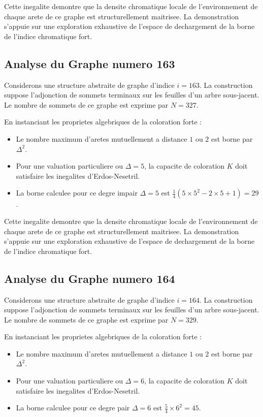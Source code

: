 \documentclass[11pt,a4paper]{article}
\begin{document}
Cette inegalite demontre que la densite chromatique locale de l'environnement de chaque arete de ce graphe est structurellement maitrisee. La demonstration s'appuie sur une exploration exhaustive de l'espace de dechargement de la borne de l'indice chromatique fort.

\subsection{Analyse du Graphe numero 163}
Considerons une structure abstraite de graphe d'indice $i = 163$. La construction suppose l'adjonction de sommets terminaux sur les feuilles d'un arbre sous-jacent. Le nombre de sommets de ce graphe est exprime par $N = 327$.

En instanciant les proprietes algebriques de la coloration forte :
\begin{itemize}
\item Le nombre maximum d'aretes mutuellement a distance $1$ ou $2$ est borne par $\Delta^2$.
\item Pour une valuation particuliere ou $\Delta = 5$, la capacite de coloration $K$ doit satisfaire les inegalites d'Erdos-Nesetril.
\item La borne calculee pour ce degre impair $\Delta = 5$ est $\frac{1}{4}(5 \times 5^2 - 2 \times 5 + 1) = 29$.
\end{itemize}

Cette inegalite demontre que la densite chromatique locale de l'environnement de chaque arete de ce graphe est structurellement maitrisee. La demonstration s'appuie sur une exploration exhaustive de l'espace de dechargement de la borne de l'indice chromatique fort.

\subsection{Analyse du Graphe numero 164}
Considerons une structure abstraite de graphe d'indice $i = 164$. La construction suppose l'adjonction de sommets terminaux sur les feuilles d'un arbre sous-jacent. Le nombre de sommets de ce graphe est exprime par $N = 329$.

En instanciant les proprietes algebriques de la coloration forte :
\begin{itemize}
\item Le nombre maximum d'aretes mutuellement a distance $1$ ou $2$ est borne par $\Delta^2$.
\item Pour une valuation particuliere ou $\Delta = 6$, la capacite de coloration $K$ doit satisfaire les inegalites d'Erdos-Nesetril.
\item La borne calculee pour ce degre pair $\Delta = 6$ est $\frac{5}{4} \times 6^2 = 45$.
\end{itemize}
\end{document}
